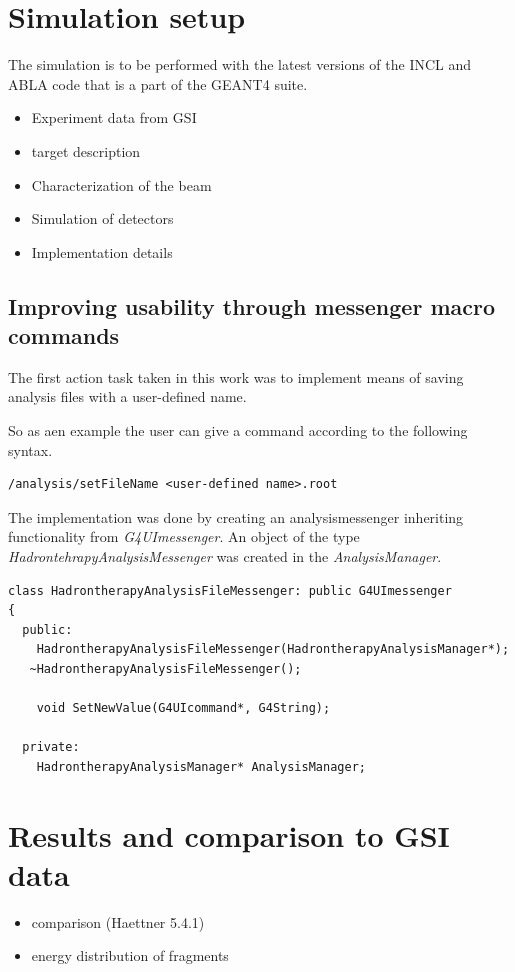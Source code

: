 \section{Simulation setup} %
The simulation is to be performed with the latest versions of the INCL and ABLA code that is a part of the GEANT4 suite.

\begin{itemize}
\item Experiment data from GSI
\item target description
\item Characterization of the beam
\item Simulation of detectors
\item Implementation details
\end{itemize}

\subsection{Improving usability through messenger macro commands}
The first action task taken in this work was to implement means of saving analysis files with a user-defined name.

So as aen example the user can give a command according to the following syntax.
\scriptsize
\begin{verbatim}
/analysis/setFileName <user-defined name>.root
\end{verbatim}
\normalsize

The implementation was done by creating an analysismessenger inheriting functionality from \textit{G4UImessenger}. An object of the type \textit{HadrontehrapyAnalysisMessenger} was created in the \textit{AnalysisManager}.


\scriptsize
\begin{verbatim}
class HadrontherapyAnalysisFileMessenger: public G4UImessenger
{
  public:
    HadrontherapyAnalysisFileMessenger(HadrontherapyAnalysisManager*);
   ~HadrontherapyAnalysisFileMessenger();
    
    void SetNewValue(G4UIcommand*, G4String);
    
  private:
    HadrontherapyAnalysisManager* AnalysisManager;
\end{verbatim}
\normalsize



\section{Results and comparison to GSI data}
\begin{itemize}
\item comparison (Haettner 5.4.1)
\item energy distribution of fragments
\end{itemize}

